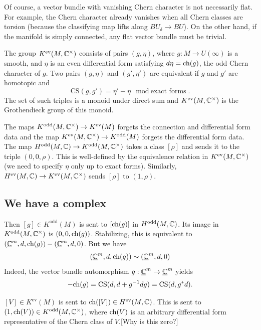 \documentclass[10pt]{amsart}
\begin{document}
\begin{remark}
Of course, a vector bundle with vanishing Chern character is not necessarily flat. For example, the Chern character already vanishes when all Chern classes are torsion (because the classifying map lifts along $BU_\delta \to BU$). On the other hand, if the manifold is simply connected, any flat vector bundle must be trivial. 
\end{remark}

The group $K^{\mathrm{ev}}(M, \mathbb{C}^\times)$ consists of pairs $(g, \eta)$, where $g : M \to U(\infty)$ is a smooth, and $\eta$ is an even differential form satisfying $d\eta = \mathrm{ch}(g)$, the odd Chern character of $g$. Two pairs $(g, \eta)$ and $(g', \eta')$ are equivalent if $g$ and $g'$ are homotopic and 
\[
\mathrm{CS}(g, g') = \eta' - \eta \mod \text{exact forms}.
\]
The set of such triples is a monoid under direct sum and $K^{\mathrm{ev}}(M, \mathbb{C}^\times)$ is the Grothendieck group of this monoid.

The maps $K^{\mathrm{odd}}(M, \mathbb{C}^\times) \to K^{\mathrm{ev}}(M)$ forgets the connection and differential form data and the map $K^{\mathrm{ev}}(M, \mathbb{C}^\times) \to K^{\mathrm{odd}}(M)$ forgets the differential form data. The map $H^{\mathrm{odd}}(M, \mathbb{C}) \to K^{\mathrm{odd}}(M, \mathbb{C}^\times)$ takes a class $[\rho]$ and sends it to the triple $(0, 0, \rho)$. This is well-defined by the equivalence relation in $K^{\mathrm{ev}}(M, \mathbb{C}^\times)$ (we need to specify $\eta$ only up to exact forms). Similarly, $H^{\mathrm{ev}}(M, \mathbb{C}) \to K^{\mathrm{ev}}(M, \mathbb{C}^\times)$ sends $[\rho]$ to $(1, \rho)$.

\subsection{We have a complex}
Then $[g] \in K^{\mathrm{odd}}(M)$ is sent to $[\mathrm{ch}(g)]$ in $H^{\mathrm{odd}}(M, \mathbb{C})$. Its image in $K^{\mathrm{odd}}(M, \mathbb{C}^\times)$ is $(0, 0, \mathrm{ch}(g))$. Stabilizing, this is equivalent to $(\underline{\mathbb{C}}^m, d, \mathrm{ch}(g)) - (\underline{\mathbb{C}}^m, d, 0)$. But we have
\[
(\underline{\mathbb{C}}^m, d, \mathrm{ch}(g)) \sim (\underline{\mathbb{C}}^m, d, 0)
\]
Indeed, the vector bundle automorphism $g: \underline{\mathbb{C}}^m \to \underline{\mathbb{C}}^m$ yields
\[
- \mathrm{ch}(g) = \mathrm{CS}(d, d + g^{-1}dg) = \mathrm{CS}(d, g^*d).
\]

$[V] \in K^{\mathrm{ev}}(M)$ is sent to $\mathrm{ch}([V]) \in H^{\mathrm{ev}}(M, \mathbb{C})$.
This is sent to $(1, \mathrm{ch}(V))\in K^{\mathrm{odd}}(M, \mathbb{C}^\times)$, where $\mathrm{ch}(V)$ is an arbitrary differential form representative of the Chern class of $V$.{\color{red}[Why is this zero?]}
\end{document}
